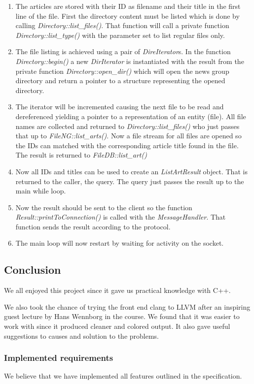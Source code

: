 \documentclass[10pt, a4paper]{article}
\begin{document}
\begin{enumerate}
	\item The articles are stored with their ID as filename and their title in the first line of the file. First the directory content must be listed which is done by calling \emph{Directory::list\_files()}. That function will call a private function \emph{Directory::list\_type()} with the parameter set to list regular files only.
	\item The file listing is achieved using a pair of \emph{DireIterator}s. In the function \emph{Directory::begin()} a new \emph{DirIterator} is instantiated with the result from the private function \emph{Directory::open\_dir()} which will open the news group directory and return a pointer to a structure representing the opened directory.
	\item The iterator will be incremented causing the next file to be read and dereferenced yielding a pointer to a representation of an entity (file). All file names are collected and returned to \emph{Directory::list\_files()} who just passes that up to \emph{FileNG::list\_arts()}. Now a file stream for all files are opened so the IDs can matched with the corresponding article title found in the file. The result is returned to \emph{FileDB::list\_art()}
	\item Now all IDs and  titles can be used to create an \emph{ListArtResult} object. That is returned to the caller, the query. The query just passes the result up to the main while loop.
	\item Now the result should be sent to the client so the function \emph{Result::printToConnection()} is called with the \emph{MessageHandler}. That function sends the result according to the protocol.
	\item The main loop will now restart by waiting for activity on the socket.
\end{enumerate}


\subsection{Conclusion}
We all enjoyed this project since it gave us practical knowledge with C++.

We also took the chance of trying the front end clang to LLVM after an inspiring guest lecture by Hans Wennborg in the course. We found that it was easier to work with since it produced cleaner and colored output. It also gave useful suggestions to causes and solution to the problems.

\subsubsection{Implemented requirements}
We believe that we have implemented all features outlined in the specification.
\end{document}
